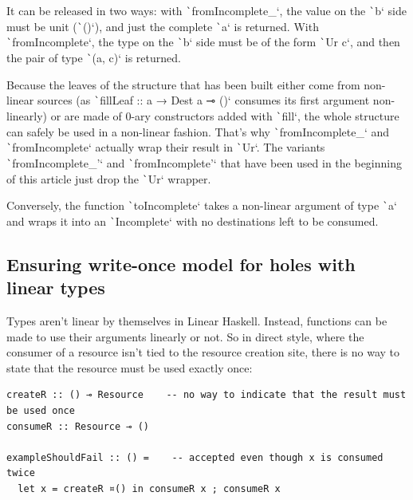\documentclass[english]{jflart}
\newlength{\currentparskip}
\newenvironment{unbreakable}
{%
  \setlength{\currentparskip}{\parskip}%
  \setlength{\parskip}{\currentparskip}%
  \par\vspace{0.5\baselineskip}%
  \noindent\begin{minipage}{\textwidth}%
    \setlength{\parskip}{\currentparskip}%
}
{%
  \end{minipage}%
  \par\vspace{0.5\baselineskip}%
}
\begin{document}
It can be released in two ways: with \texttt`fromIncomplete_`, the value on the \texttt`b` side must be unit (\texttt`()`), and just the complete \texttt`a` is returned. With \texttt`fromIncomplete`, the type on the \texttt`b` side must be of the form \texttt`Ur c`, and then the pair of type \texttt`(a, c)` is returned.

Because the leaves of the structure that has been built either come from non-linear sources (as \texttt`fillLeaf :: a → Dest a ⊸ ()` consumes its first argument non-linearly) or are made of 0-ary constructors added with \texttt`fill`, the whole structure can safely be used in a non-linear fashion. That's why \texttt`fromIncomplete_` and \texttt`fromIncomplete` actually wrap their result in \texttt`Ur`. The variants \texttt`fromIncomplete_'` and \texttt`fromIncomplete'` that have been used in the beginning of this article just drop the \texttt`Ur` wrapper.

Conversely, the function \texttt`toIncomplete` takes a non-linear argument of type \texttt`a` and wraps it into an \texttt`Incomplete` with no destinations left to be consumed.

\subsection{Ensuring write-once model for holes with linear types}\label{ssec:api-linearity}

Types aren't linear by themselves in Linear Haskell. Instead, functions can be made to use their arguments linearly or not. So in direct style, where the consumer of a resource isn't tied to the resource creation site, there is no way to state that the resource must be used exactly once:

\begin{unbreakable}
{\small
\begin{verbatim}
createR :: () ⊸ Resource    -- no way to indicate that the result must be used once
consumeR :: Resource ⊸ ()

exampleShouldFail :: () =    -- accepted even though x is consumed twice
  let x = createR ¤() in consumeR x ; consumeR x
\end{verbatim}
}
\end{unbreakable}
\end{document}
